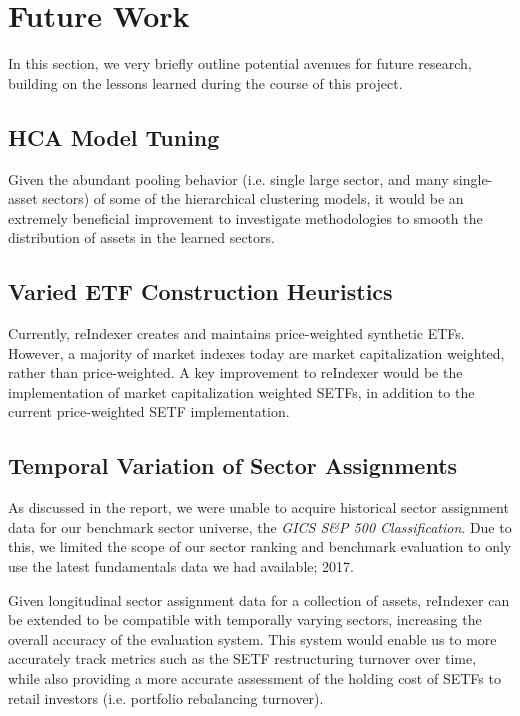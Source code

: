 \documentclass[../main.tex]{subfiles}
\begin{document}
    
\chapter{Future Work}
    
In this section, we very briefly outline potential avenues for future research, building on the lessons learned during the course of this project.

\section{HCA Model Tuning}

Given the abundant pooling behavior (i.e. single large sector, and many single-asset sectors) of some of the hierarchical clustering models, it would be an extremely beneficial improvement to investigate methodologies to smooth the distribution of assets in the learned sectors.

\section{Varied ETF Construction Heuristics}

Currently, reIndexer creates and maintains price-weighted synthetic ETFs. However, a majority of market indexes today are market capitalization weighted, rather than price-weighted. A key improvement to reIndexer would be the implementation of market capitalization weighted SETFs, in addition to the current price-weighted SETF implementation.

\section{Temporal Variation of Sector Assignments}

As discussed in the report, we were unable to acquire historical sector assignment data for our benchmark sector universe, the \textit{GICS S\&P 500 Classification}. Due to this, we limited the scope of our sector ranking and benchmark evaluation to only use the latest fundamentals data we had available; 2017.

Given longitudinal sector assignment data for a collection of assets, reIndexer can be extended to be compatible with temporally varying sectors, increasing the overall accuracy of the evaluation system. This system would enable us to more accurately track metrics such as the SETF restructuring turnover over time, while also providing a more accurate assessment of the holding cost of SETFs to retail investors (i.e. portfolio rebalancing turnover).
\end{document}

